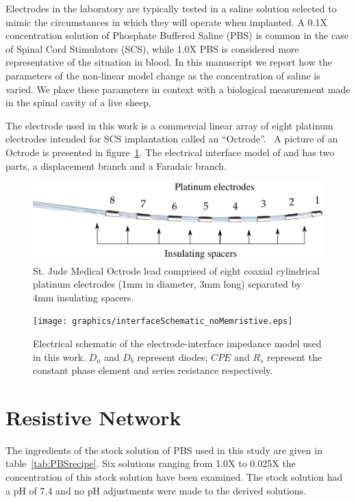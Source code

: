 \documentclass[10pt,final,journal]{IEEEtran}
\begin{document}
Electrodes in the laboratory are typically tested in a saline solution selected to mimic the circumstances in which they will operate when implanted.
A 0.1X concentration solution of Phosphate Buffered Saline (PBS) is common in the case of Spinal Cord Stimulators (SCS), while 1.0X PBS is considered more representative of the situation in blood.
In this manuscript we report how the parameters of the non-linear model change as the concentration of saline is varied. We place these parameters in context with a biological measurement made in the spinal cavity of a live sheep.

The electrode used in this work is a commercial linear array of eight platinum electrodes intended for SCS implantation called an ``Octrode''.~\cite{StJudeOctrode} A picture of an Octrode is presented in figure~\ref{fig:octrode}.
The electrical interface model of \cite{Franks2005} and \cite{ScottSingle2013} has two parts, a displacement branch and a Faradaic branch.

\begin{figure}
    \begin{center}
    \includegraphics{graphics/StJudeOctrodeDiagram3}
    \end{center}
    \caption{St. Jude Medical Octrode lead comprised of eight coaxial cylindrical platinum electrodes (1mm in diameter, 3mm long) separated by 4mm insulating spacers.}
    \label{fig:octrode}
\end{figure}

\begin{figure}
    \begin{center}
        \texttt{[image: graphics/interfaceSchematic\_noMemristive.eps]}
    \end{center}
    \caption{Electrical schematic of the electrode-interface impedance model used in this work. $D_{a}$ and $D_{b}$ represent diodes; $CPE$ and $R_{s}$ represent the constant phase element and series resistance respectively.}
    \label{fig:schematic}
\end{figure}

\section{Resistive Network}
The ingredients of the stock solution of PBS used in this study are given in table~\ref{tab:PBSrecipe}.
Six solutions ranging from 1.0X to 0.025X the concentration of this stock solution have been examined. 
The stock solution had a pH of 7.4 and no pH adjustments were made to the derived solutions. 
\end{document}
